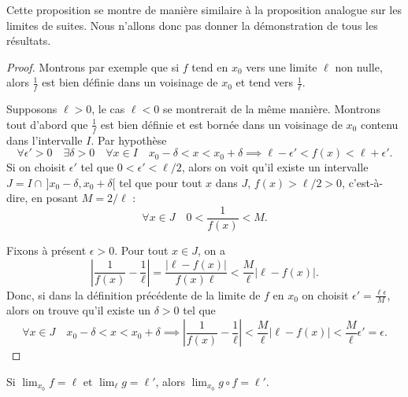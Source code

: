 \documentclass[class=report,crop=false]{standalone}
\begin{document}
Cette proposition se montre de manière similaire à la proposition analogue sur les limites de suites. 
Nous n'allons donc pas donner la démonstration de tous les résultats.

\begin{proof}
Montrons par exemple que si $f$ tend en $x_0$ vers une limite $\ell$ non nulle, alors $\frac 1 f$ 
est bien définie dans un voisinage de $x_0$ et tend vers $\frac 1\ell$.

Supposons $\ell>0$, le cas $\ell<0$ se montrerait de la même manière. Montrons tout d'abord que $\frac 1 f$ 
est bien définie et est bornée dans un voisinage de $x_0$ contenu dans l'intervalle $I$. Par hypothèse
\[
\forall \epsilon'>0 \quad \exists \delta>0 \quad \forall x\in I \quad x_0-\delta<x <x_0+\delta
\implies \ell-\epsilon' < f(x) <\ell+\epsilon'.
\]
Si on choisit $\epsilon'$ tel que $0<\epsilon'<\ell/2$, alors on voit qu'il existe un intervalle $J=I\cap  \, ]x_0-\delta,x_0+\delta [$ tel que pour tout $x$ dans $J$, $f(x)>\ell/2>0$, c'est-à-dire, en posant $M=2/\ell$ :
\[
\forall x\in J \quad 0< \frac{1}{f(x)} < M.
\]

Fixons à présent $\epsilon>0$. Pour tout $x\in J$, on a
\[
\left\vert \frac{1}{f(x)} - \frac1\ell  \right\vert = \frac{\left\vert \ell - f(x) \right\vert }{f(x)\ell} < \frac{M}{\ell}\left\vert \ell - f(x) \right\vert .
\]
Donc, si dans la définition précédente de la limite de $f$ en $x_0$ on choisit $\epsilon'=\frac{\ell \epsilon}{M}$, alors on trouve qu'il existe un $\delta>0$ tel que
\[
\forall x\in J \quad x_0-\delta<x <x_0+\delta
\implies \left\vert \frac{1}{f(x)} - \frac1\ell  \right\vert
< \frac{M}{\ell}\left\vert \ell - f(x) \right\vert
 <  \frac{M}{\ell}\epsilon'  = \epsilon  .
\]
\end{proof}

\begin{proposition}
Si $\displaystyle\lim_{x_0} f=\ell$ et $\displaystyle\lim_\ell g=\ell'$, alors
$\displaystyle\lim_{x_0} g\circ f=\ell'$.
\end{proposition}

\bigskip
\end{document}
